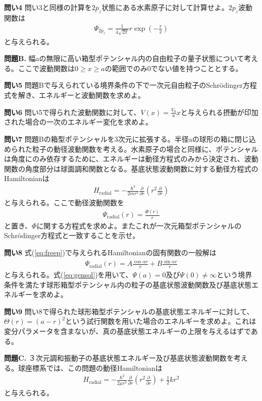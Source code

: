 \documentclass[11pt,pra,aps]{revtex4}
\begin{document}
\noindent
{\bf 問い4} 問い3と同様の計算を2$p_z$状態にある水素原子に対して計算せよ。2$p_z$波動関数は
\begin{align}
  \Psi_{2p_z}=\frac{1}{4\sqrt{2\pi}} r \exp(-\frac{r}{2})
\end{align}
と与えられる。

\noindent
{\bf 問題B.} 幅aの無限に高い箱型ポテンシャル内の自由粒子の量子状態について考える。ここで波動関数は$0\geq x\geq a$の範囲でのみ0でない値を持つこととする。

\noindent
{\bf 問い5} 問題Bで与えられている境界条件の下で一次元自由粒子のSchr\"odinger方程式を解き、エネルギーと波動関数を求めよ。

\noindent
{\bf 問い6} 問い5で得られた波動関数に対して、$V(x)=\frac{V_0}{a}x$と与えられる摂動が印加された場合の一次のエネルギー変化を求めよ。

\noindent
{\bf 問い7} 問題Bの箱型ポテンシャルを3次元に拡張する。半径aの球形の箱に閉じ込められた粒子の動径波動関数を考える。水素原子の場合と同様に、ポテンシャルは角度にのみ依存するために、エネルギーは動径方程式のみから決定され、波動関数の角度部分は球面調和関数となる。基底状態波動関数に対する動径方程式のHamiltonianは
\begin{align}
  H_\text{radial}=-\frac{\hbar^2}{2mr^2}\frac{\partial}{\partial r}\left(r^2 \frac{\partial}{\partial r}\right) \label{eq:freep}
\end{align}    
と与えられる。ここで動径波動関数を
\begin{align}
  \Psi_\text{radial}(r)=\frac{\Phi(r)}{r}
\end{align}
と置き、$\Phi$に関する方程式を求めよ。またこれが一次元箱型ポテンシャルのSchr\"odinger方程式と一致することを示せ。

\noindent
{\bf 問い8} 式(\ref{eq:freep})で与えられるHamiltonianの固有関数の一般解は
\begin{align}
  \Psi_\text{radial}(r)=A\frac{\cos\alpha r}{r} + B\frac{\sin\alpha r}{r} \label{eq:gensol}
\end{align}
と与えられる。式(\ref{eq:gensol})を用いて、$\Psi(a)=0$及び$\Psi(0)\neq\infty$という境界条件を満たす球形箱型ポテンシャル内の粒子の基底状態波動関数及び基底状態エネルギーを求めよ。

\noindent
{\bf 問い9} 問い8で得られた球形箱型ポテンシャルの基底状態エネルギーに対して、$\Theta(r)=(a-r)^2$という試行関数を用いた場合のエネルギーを求めよ。これは変分パラメータを含まないが、真の基底状態エネルギーの上限を与えるはずである。

\noindent
{\bf 問題C.} ３次元調和振動子の基底状態エネルギー及び基底状態波動関数を考える。球座標系では、この問題の動径Hamiltonianは
\begin{align}
  H_\text{radial}=-\frac{\hbar^2}{2\mu r^2}\frac{\partial}{\partial r}\left(r^2 \frac{\partial}{\partial r}\right) + \frac{1}{2}kr^2\label{eq:3dp}
\end{align}    
と与えられる。
\end{document}
